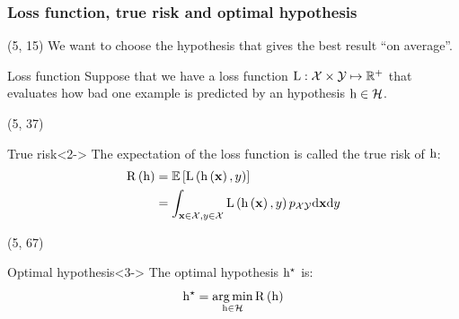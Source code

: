 \begin{frame}
  \frametitle{Loss function, true risk and optimal hypothesis}

  \begin{textblock}{90}(5, 15)
    We want to choose the hypothesis that gives the best result ``on
      average''.
    \begin{block}{Loss function}
      Suppose that we have a loss function $\mathrm{L}: \mathcal{X} \times \mathcal{Y} \mapsto
      \mathbb{R}^+$ that evaluates how bad one example is predicted by an hypothesis
      $\mathrm{h} \in \mathcal{H}$.
    \end{block}
  \end{textblock}

  \begin{textblock}{90}(5, 37)
    \begin{block}{True risk}<2->
      The expectation of the loss function is called the true risk of $\mathrm{h}$:
      \begin{equation*}
        \begin{split}
          \mathrm{R} \left ( {\mathrm{h}} \right ) & = \mathrm{\mathbb{E}} \left [ {\mathrm{L} \left ( {\mathrm{h} \left ( {\mathbf{x}} \right ), y} \right )} \right ]\\
                              & = \int_{\mathbf{x} \in \mathcal{X}, y \in \mathcal{X}}
                                \mathrm{L} \left ( {\mathrm{h} \left ( {\mathbf{x}} \right ), y} \right ) p_{\mathcal{X} \mathcal{Y}} \mathrm{d} \mathbf{x} \mathrm{d} y
        \end{split}
      \end{equation*}
    \end{block}
  \end{textblock}

  \begin{textblock}{90}(5, 67)
    \begin{block}{Optimal hypothesis}<3->
      The optimal hypothesis $\mathrm{h}^{\star}$ is:
      \[
        \mathrm{h}^{\star} = \operatorname*{arg\,min}_{\mathrm{h} \in \mathcal{H}} \mathrm{R} \left ( {\mathrm{h}} \right )
      \]
    \end{block}
  \end{textblock}
\end{frame}


